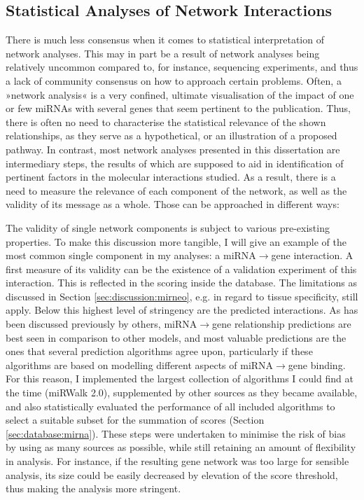 \subsection{Statistical Analyses of Network Interactions} \label{sec:discussion:network-statistics}
There is much less consensus when it comes to statistical interpretation of network analyses. This may in part be a result of network analyses being relatively uncommon compared to, for instance, sequencing experiments, and thus a lack of community consensus on how to approach certain problems. Often, a »network analysis« is a very confined, ultimate visualisation of the impact of one or few miRNAs with several genes that seem pertinent to the publication. Thus, there is often no need to characterise the statistical relevance of the shown relationships, as they serve as a hypothetical, or an illustration of a proposed pathway. In contrast, most network analyses presented in this dissertation are intermediary steps, the results of which are supposed to aid in identification of pertinent factors in the molecular interactions studied. As a result, there is a need to measure the relevance of each component of the network, as well as the validity of its message as a whole. Those can be approached in different ways:

The validity of single network components is subject to various pre-existing properties. To make this discussion more tangible, I will give an example of the most common single component in my analyses: a miRNA$\to$gene interaction. A first measure of its validity can be the existence of a validation experiment of this interaction. This is reflected in the scoring inside the database. The limitations as discussed in Section \ref{sec:discussion:mirneo}, e.g. in regard to tissue specificity, still apply. Below this highest level of stringency are the predicted interactions. As has been discussed previously by others, miRNA$\to$gene relationship predictions are best seen in comparison to other models, and most valuable predictions are the ones that several prediction algorithms agree upon, particularly if these algorithms are based on modelling different aspects of miRNA$\to$gene binding.\cite{Witkos2011} For this reason, I implemented the largest collection of algorithms I could find at the time (miRWalk 2.0\cite{Dweep2015}), supplemented by other sources as they became available, and also statistically evaluated the performance of all included algorithms to select a suitable subset for the summation of scores (Section \ref{sec:database:mirna}). These steps were undertaken to minimise the risk of bias by using as many sources as possible, while still retaining an amount of flexibility in analysis. For instance, if the resulting gene network was too large for sensible analysis, its size could be easily decreased by elevation of the score threshold, thus making the analysis more stringent.


